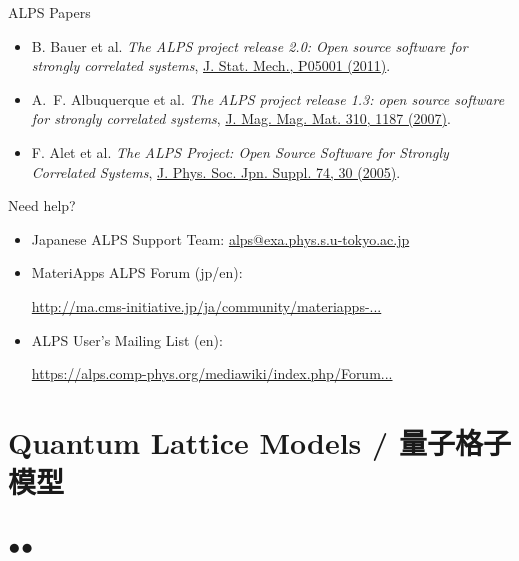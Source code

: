 \begin{frame}[t,fragile]{ALPS Papers}
  \begin{itemize}
    \setlength{\itemsep}{1em}
  \item B. Bauer et al. {\it The ALPS project release 2.0: Open source software for strongly correlated systems}, \href{http://iopscience.iop.org/1742-5468/2011/05/P05001}{J. Stat. Mech., P05001 (2011)}.
  \item A.~F. Albuquerque et al. {\it The ALPS project release 1.3: open source software for strongly correlated systems}, \href{http://dx.doi.org/10.1016/j.jmmm.2006.10.304}{J. Mag. Mag. Mat. 310, 1187 (2007)}.
  \item F. Alet et al. {\it The ALPS Project: Open Source Software for
      Strongly Correlated Systems}, \href{http://jpsj.ipap.jp/link?JPSJS/74S/30}{J. Phys. Soc. Jpn. Suppl. 74, 30 (2005)}.
  \end{itemize}
\end{frame}

\begin{frame}[t,fragile]{Need help?}
  \begin{itemize}
    \setlength{\itemsep}{1em}
  \item Japanese ALPS Support Team: {\footnotesize \href{mailto:alps@exa.phys.s.u-tokyo.ac.jp}{alps@exa.phys.s.u-tokyo.ac.jp}}
  \item MateriApps ALPS Forum (jp/en):

    {\footnotesize \href{http://ma.cms-initiative.jp/ja/community/materiapps-messageboard/alps}{http://ma.cms-initiative.jp/ja/community/materiapps-...}}
  \item ALPS User's Mailing List (en):

    {\footnotesize \href{https://alps.comp-phys.org/mediawiki/index.php/Forum:Overview}{https://alps.comp-phys.org/mediawiki/index.php/Forum...}}
  \end{itemize}
\end{frame}

\section{Quantum Lattice Models / 量子格子模型}
\subsection*{{\protect\color{red}●}{\protect\color{blue}●}}

